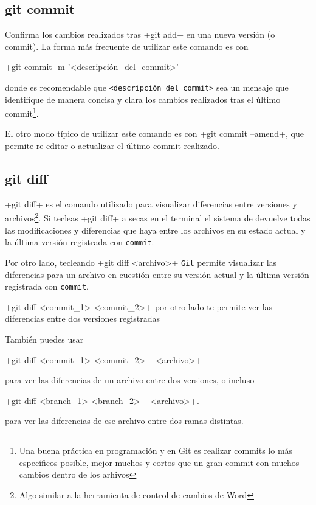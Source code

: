 \documentclass[a5paper,10pt]{article}
\begin{document}
    \subsection{git commit}
      Confirma los cambios realizados tras \cverb+git add+ en una nueva versión (o commit). La forma más frecuente de utilizar este comando es con
      
      \cverb+git commit -m '<descripción_del_commit>'+
      
      donde es recomendable que \verb+<descripción_del_commit>+ sea un mensaje que identifique de manera concisa y clara los cambios realizados tras el último commit\footnote{Una buena práctica en programación y en Git es realizar commits lo más específicos posible, mejor muchos y cortos que un gran commit con muchos cambios dentro de los arhivos}. 
      
      El otro modo típico de utilizar este comando es con \cverb+git commit --amend+, que permite re-editar o actualizar el último commit realizado.
      
    \subsection{git diff}
    \cverb+git diff+ es el comando utilizado para visualizar diferencias entre versiones y archivos\footnote{Algo similar a la herramienta de control de cambios de Word}. Si tecleas \cverb+git diff+ a secas en el terminal el sistema de devuelve todas las modificaciones y diferencias que haya entre los archivos en su estado actual y la última versión registrada con \verb+commit+.
    
    Por otro lado, tecleando \cverb+git diff <archivo>+ \verb+Git+ permite visualizar las diferencias para un archivo en cuestión entre su versión actual y la última versión registrada con \verb+commit+.
    
    \cverb+git diff <commit_1> <commit_2>+ por otro lado te permite ver las diferencias entre dos versiones registradas
    
    También puedes usar 
    
    \cverb+git diff <commit_1> <commit_2> -- <archivo>+ 
    
    para ver las diferencias de un archivo entre dos versiones, o incluso 
    
    \cverb+git diff <branch_1> <branch_2> -- <archivo>+.
    
    para ver las diferencias de ese archivo entre dos ramas distintas.
    
\end{document}
